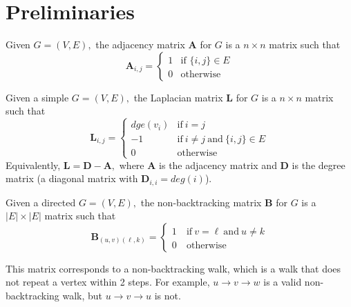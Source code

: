 \section{Preliminaries}
\begin{definition}
    Given $G=(V, E),$ the adjacency matrix $\mathbf{A}$ for $G$ is a $n\times n$ matrix such that\begin{equation*}
    \mathbf{A}_{i, j} = 
    \begin{cases} 
    1 & \text{if } \{i, j\}\in E\\
    0 & \text{otherwise}
    \end{cases}
    \end{equation*}
\end{definition}
\begin{definition}
Given a simple $G=(V, E),$ the Laplacian matrix $\mathbf{L}$ for $G$ is a $n\times n$ matrix such that\begin{equation*}
    \mathbf{L}_{i, j} = 
    \begin{cases} 
    dge(v_i) & \text{if}~i=j\\
    -1 & \text{if}~i\neq j~\text{and}~\{i, j\}\in E\\
    0 & \text{otherwise}
    \end{cases}
    \end{equation*}
Equivalently, $\mathbf{L}=\mathbf{D}-\mathbf{A},$ where $\mathbf{A}$ is the adjacency matrix and $\mathbf{D}$ is the degree matrix (a diagonal matrix with $\mathbf{D}_{i, i}=deg(i)$).
\end{definition}
\begin{definition}\label{def: non_backtracking}
Given a directed $G=(V, E),$ the non-backtracking matrix $\mathbf{B}$ for $G$ is a $|E|\times |E|$ matrix such that\begin{equation*}
     \mathbf{B}_{(u,v)(\ell,k)} = 
    \begin{cases} 
    1 &~\text{if}~v = \ell~\text{and}~u \neq k \\
    0 &~\text{otherwise}
    \end{cases}
\end{equation*}
\end{definition}
\begin{remark}
This matrix corresponds to a non-backtracking walk, which is a walk that does not repeat a vertex within 2 steps. For example, $u\to v\to w$ is a valid non-backtracking walk, but $u\to v\to u$ is not.
\begin{center}
\end{center}
\end{remark}
